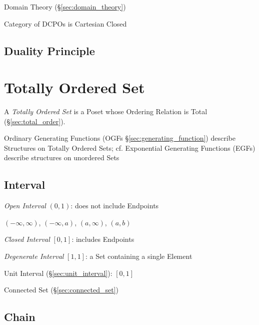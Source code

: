 Domain Theory (\S\ref{sec:domain_theory})

Category of DCPOs is Cartesian Closed



\subsection{Duality Principle}\label{sec:duality_principle}



\section{Totally Ordered Set}\label{sec:totally_ordered}

A \emph{Totally Ordered Set} is a Poset whose Ordering Relation is
Total (\S\ref{sec:total_order}).

\fist Ordinary Generating Functions (OGFs \S\ref{sec:generating_function})
describe Structures on Totally Ordered Sets; cf. Exponential Generating
Functions (EGFs) describe structures on unordered Sets



\subsection{Interval}\label{sec:interval}

\emph{Open Interval} $(0,1)$: does not include Endpoints

$(-\infty, \infty)$, $(-\infty,a)$, $(a,\infty)$, $(a,b)$

\emph{Closed Interval} $[0,1]$: includes Endpoints

\emph{Degenerate Interval} $[1,1]$: a Set containing a single Element

Unit Interval (\S\ref{sec:unit_interval}): $[0,1]$

Connected Set (\S\ref{sec:connected_set})



\subsection{Chain}\label{sec:chain}

